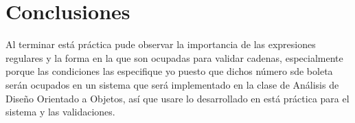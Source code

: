 \documentclass[12pt]{article}
\begin{document}

	\section{Conclusiones}

	Al terminar está práctica pude observar la importancia de las expresiones regulares y la forma en la que 
	son ocupadas para validar cadenas, especialmente porque las condiciones las especifique yo puesto que 
	dichos número sde boleta serán ocupados en un sistema que será implementado en la clase de Análisis
	de Diseño Orientado a Objetos, así que usare lo desarrollado en está práctica para el sistema y las 
	validaciones. 
\end{document}
